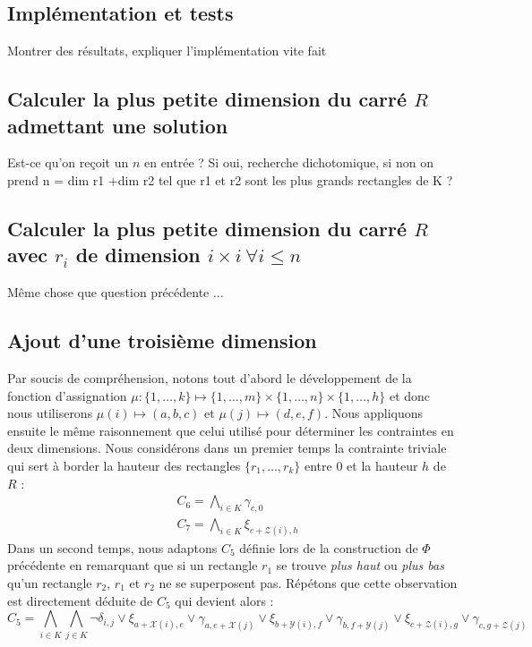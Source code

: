 \documentclass[a4paper]{article}
\begin{document}
\subsection{Implémentation et tests}
Montrer des résultats, expliquer l'implémentation vite fait
\subsection{Calculer la plus petite dimension du carré $R$ admettant une solution}
Est-ce qu'on reçoit un $n$ en entrée ? Si oui, recherche dichotomique, si non on prend n = dim r1 +dim r2 tel que r1 et r2 sont les plus grands rectangles de K ? 
\subsection{Calculer la plus petite dimension du carré $R$ avec $r_i$ de dimension $i\times i \ \forall i \leq n$}
Même chose que question précédente ... 
\subsection{Ajout d'une troisième dimension}
Par soucis de compréhension, notons tout d'abord le développement de la fonction d'assignation $\mu :\{1,\dots,k\} \mapsto \{1,\dots,m\}\times\{1,\dots,n\}\times\{1,\dots,h\}$ et donc nous utiliserons $\mu(i) \mapsto (a, b, c)$ et $ \mu(j) \mapsto (d, e, f)$.
Nous appliquons ensuite le même raisonnement que celui utilisé pour déterminer les contraintes en deux dimensions. Nous considérons dans un premier temps la contrainte triviale qui sert à border la hauteur des rectangles $\{r_1,\dots ,r_k\}$ entre $0$ et la hauteur $h$ de $R$ :
\begin{equation*}
\begin{split}
	&C_6 = \bigwedge\limits_{i\in K} \gamma_{c, 0}\\
	&C_7 = \bigwedge\limits_{i\in K} \xi_{c + \mathcal{Z}(i), h}
\end{split}
\end{equation*}
Dans un second temps, nous adaptons $C_5$ définie lors de la construction de $\Phi$ précédente en remarquant que si un rectangle $r_1$ se trouve \textit{plus haut} ou \textit{plus bas} qu'un rectangle $r_2$, $r_1$ et $r_2$ ne se superposent pas. Répétons que cette observation est directement déduite de $C_5$ qui devient alors :
\begin{equation*}
	C_5 = \bigwedge\limits_{i\in K}\bigwedge\limits_{j\in K} \lnot \delta_{i,j} \lor \xi_{a + \mathcal{X}(i), e} \lor \gamma_{a, e +\mathcal{X}(j)} \lor \xi_{b + \mathcal{Y}(i), f} \lor \gamma_{b, f + \mathcal{Y}(j)} \lor \xi_{c + \mathcal{Z}(i), g} \lor \gamma_{c, g +\mathcal{Z}(j)}
\end{equation*}
\end{document}

